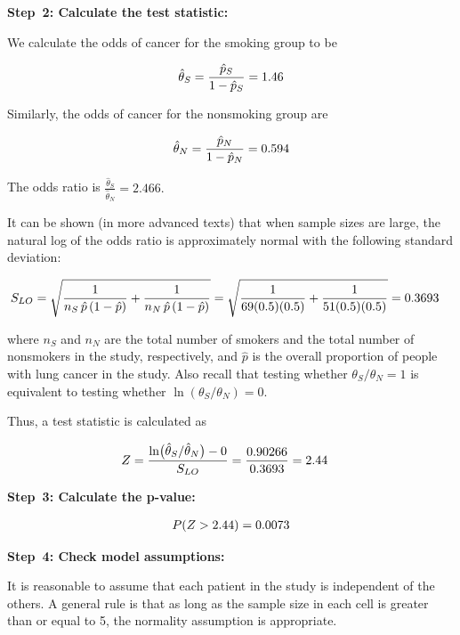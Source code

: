 \documentclass[
]{book}
\begin{document}
\textbf{Step~2: Calculate the test statistic:}

We calculate the odds of cancer for the smoking group to be

\begin{align}
\hat\theta_S = \frac{\hat p_S}{1 - \hat p_S} = 1.46 \notag
\end{align}

Similarly, the odds of cancer for the nonsmoking group are

\begin{align}
\hat\theta_N = \frac{\hat p_N}{1 - \hat p_N} = 0.594 \notag
\end{align}

The odds ratio is \(\frac{\hat\theta_S}{\hat\theta_N} = 2.466.\)

It can be shown (in more advanced texts) that when sample sizes are large, the natural log of the odds ratio is approximately normal with the following standard deviation:

\begin{align}
S_{LO} 
&= \sqrt{\frac{1}{n_S\,\hat p\,(1 - \hat p)} + \frac{1}{n_N\,\hat p\,(1 - \hat p)}} 
= \sqrt{\frac{1}{69(0.5)(0.5)} + \frac{1}{51(0.5)(0.5)}} = 0.3693
\notag
\end{align}

where \(n_S\) and \(n_N\) are the total number of smokers and the total number of nonsmokers in the study, respectively, and \(\hat p\) is the overall proportion of people with lung cancer in the study. Also recall that testing whether \(\theta_S/\theta_N = 1\) is equivalent to testing whether \(\ln(\theta_S/\theta_N) = 0\).

Thus, a test statistic is calculated as

\begin{align}
Z 
&= \frac{\ln\bigl(\hat\theta_S / \hat\theta_N\bigr) - 0}{S_{LO}}
= \frac{0.90266}{0.3693} = 2.44 \notag
\end{align}

\textbf{Step~3: Calculate the p-value:}

\begin{align}
P(Z > 2.44) = 0.0073 
\notag
\end{align}

\textbf{Step~4: Check model assumptions:}

It is reasonable to assume that each patient in the study is independent of the others. A general rule is that as long as the sample size in each cell is greater than or equal to 5, the normality assumption is appropriate.
\end{document}
